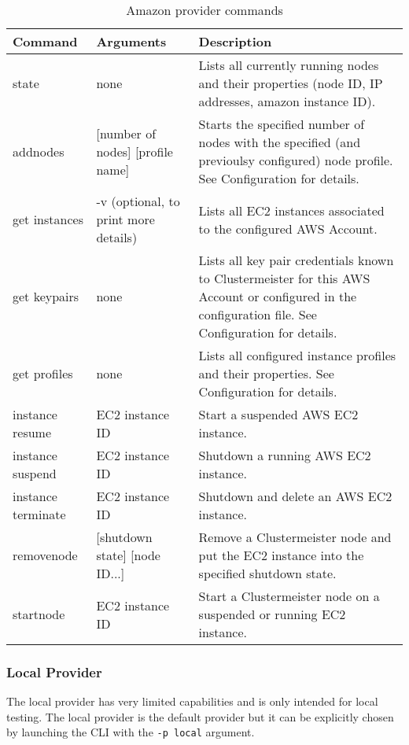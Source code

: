 \begin{table}[h]
\centering
\begin{tabular}{|l| p{3cm} | p{6cm}|}
\hline
\textbf{Command} & \textbf{Arguments} & \textbf{Description} \\ \hline
state & none & Lists all currently running nodes and their properties (node ID, IP addresses, amazon instance ID). \\ \hline
addnodes & [number of nodes] [profile name] & Starts the specified number of nodes with the specified (and previoulsy configured) node profile. See Configuration for details. \\ \hline
get instances & -v (optional, to print more details) & Lists all EC2 instances associated to the configured AWS Account. \\ \hline
get keypairs & none & Lists all key pair credentials known to Clustermeister for this AWS Account or configured in the configuration file. See Configuration for details. \\ \hline
get profiles & none & Lists all configured instance profiles and their properties. See Configuration for details. \\ \hline
instance resume & EC2 instance ID & Start a suspended AWS EC2 instance. \\ \hline
instance suspend & EC2 instance ID & Shutdown a running AWS EC2 instance. \\ \hline
instance terminate & EC2 instance ID & Shutdown and delete an AWS EC2 instance. \\ \hline
removenode & [shutdown state] [node ID...] & Remove a Clustermeister node and put the EC2 instance into the specified shutdown state. \\ \hline
startnode & EC2 instance ID & Start a Clustermeister node on a suspended or running EC2 instance. \\ \hline
\end{tabular}
\caption{Amazon provider commands}
\label{tab:amazonprovider}
\end{table}


\subsubsection{Local Provider}

The local provider has very limited capabilities and is only intended for local testing. The local provider is the default provider but it can be explicitly chosen by launching the CLI with the \texttt{-p local} argument.

